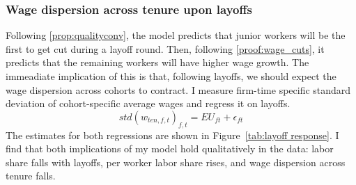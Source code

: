 \subsubsection*{Wage dispersion across tenure upon layoffs} %
Following \ref{prop:qualityconv}, the model predicts that junior workers will be the first to get cut during a layoff round. Then, following \ref{proof:wage_cuts}, it predicts that the remaining workers will have higher wage growth. The immeadiate implication of this is that, following layoffs, we should expect the wage dispersion across cohorts to contract. I measure firm-time specific standard deviation of cohort-specific average wages and regress it on layoffs.
\[ std(w_{ten,f,t})_{f,t} = EU_{ft} + \epsilon_{ft} \]
The estimates for both regressions are shown in Figure~\ref{tab:layoff response}. I find that both implications of my model hold qualitatively in the data: labor share falls with layoffs, per worker labor share rises, and wage dispersion across tenure falls.

